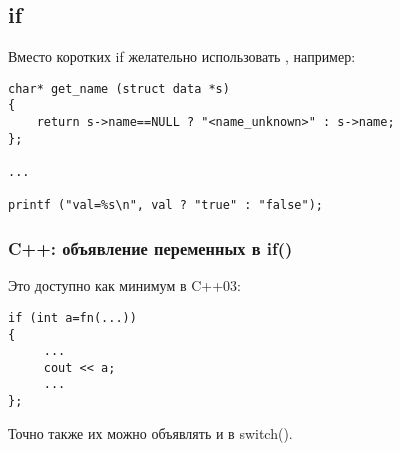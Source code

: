 ﻿\subsection{if}

Вместо коротких if желательно использовать , например:

\begin{lstlisting}
char* get_name (struct data *s)
{
	return s->name==NULL ? "<name_unknown>" : s->name;
};

...

printf ("val=%s\n", val ? "true" : "false");
\end{lstlisting}

\subsubsection{C++: объявление переменных в if()}

Это доступно как минимум в C++03:

\begin{lstlisting}
if (int a=fn(...))
{
     ...
     cout << a;
     ...
};
\end{lstlisting}

Точно также их можно объявлять и в switch().

